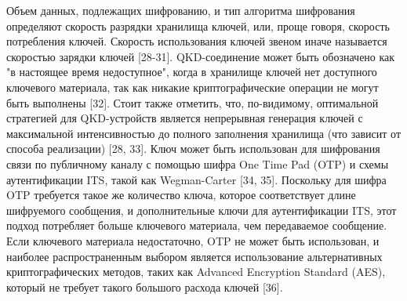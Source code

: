 Объем данных, подлежащих шифрованию, и тип алгоритма шифрования определяют скорость разрядки хранилища ключей, или, проще говоря, скорость потребления ключей. Скорость использования ключей звеном иначе называется скоростью зарядки ключей [28-31]. QKD-соединение может быть обозначено как "в настоящее время недоступное", когда в хранилище ключей нет доступного ключевого материала, так как никакие криптографические операции не могут быть выполнены [32]. Стоит также отметить, что, по-видимому, оптимальной стратегией для QKD-устройств является непрерывная генерация ключей с максимальной интенсивностью до полного заполнения хранилища (что зависит от способа реализации) [28, 33].
Ключ может быть использован для шифрования связи по публичному каналу с помощью шифра One Time Pad (OTP) и схемы аутентификации ITS, такой как Wegman-Carter [34, 35]. Поскольку для шифра OTP требуется такое же количество ключа, которое соответствует длине шифруемого сообщения, и дополнительные ключи для аутентификации ITS, этот подход потребляет больше ключевого материала, чем передаваемое сообщение. Если ключевого материала недостаточно, OTP не может быть использован, и наиболее распространенным выбором является использование альтернативных криптографических методов, таких как Advanced Encryption Standard (AES), который не требует такого большого расхода ключей [36].

